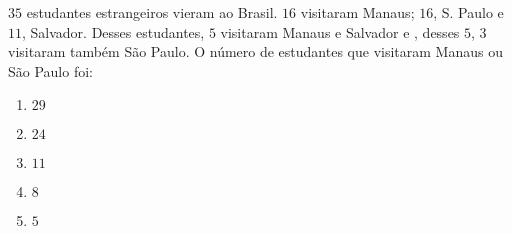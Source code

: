 \item  $35$ estudantes estrangeiros vieram ao Brasil. $16$ visitaram Manaus; $16$, S. Paulo e $11$, Salvador. Desses estudantes, $5$ visitaram Manaus e Salvador e , desses $5$, $3$ visitaram também São Paulo. O número de estudantes que visitaram Manaus ou São Paulo foi:
		\begin{multicols}{5}
\begin{enumerate}
\item $29$
\item $24$
\item $11$
\item $8$
\item $5$
\end{enumerate}
		\end{multicols}
